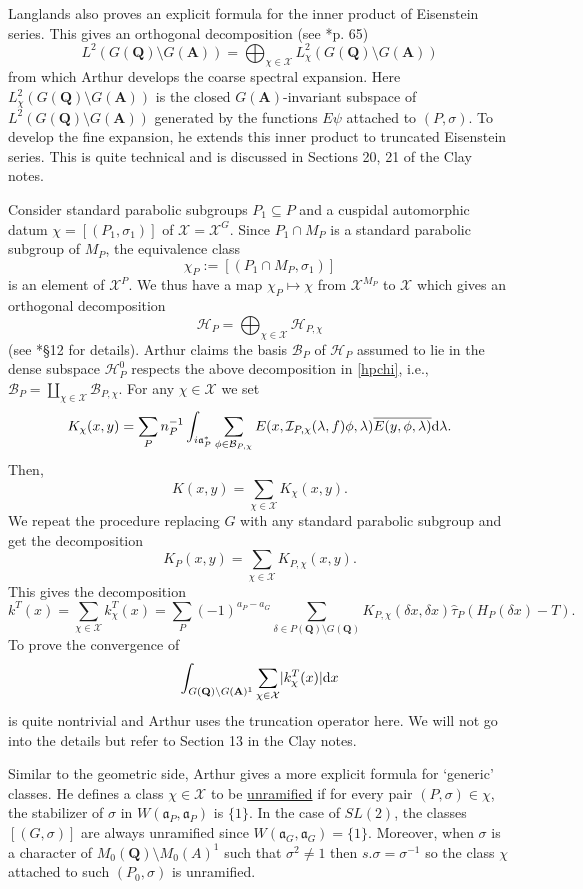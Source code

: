 \documentclass[11pt]{amsart}
\def\apg{a_{P} - a_{G}}
\def\A{\mathbf A}
\def\Q{\mathbf Q}
\def\BBB{\mathcal B}
\def\HHH{\mathcal H}
\def\III{\mathcal I}
\def\XXX{\mathcal X}
\def\aaa{\mathfrak a}
\def\d{\text d}
\def\bs{\setminus}
\def\Ltwo{L^2}
\def\mod#1{\lvert #1 \rvert} %
\theoremstyle{remark}
\begin{document}
Langlands also proves an explicit formula for the inner product of Eisenstein series. This gives an orthogonal decomposition (see \cite{clay}*{p. 65})
\begin{equation} \label{hpchi}
	\Ltwo(G(\Q)\bs G(\A)) = \bigoplus_{\chi \in \XXX} \Ltwo_\chi(G(\Q)\bs G(\A))
\end{equation}
from which Arthur develops the coarse spectral expansion. Here $\Ltwo_\chi(G(\Q)\bs G(\A))$ is the closed $G(\A)$-invariant subspace of $\Ltwo(G(\Q)\bs G(\A))$ generated by the functions $E\psi$ attached to $(P, \sigma)$. To develop the fine expansion, he extends this inner product to truncated Eisenstein series. This is quite technical and is discussed in Sections 20, 21 of the Clay notes. 

Consider standard parabolic subgroups $P_1 \subseteq P$ and a cuspidal automorphic datum $\chi = [(P_1, \sigma_1)]$ of $\XXX = \XXX^G$. Since $P_1 \cap M_P$ is a standard parabolic subgroup of $M_P$, the equivalence class 
\[ \chi_P := [(P_1 \cap M_P, \sigma_1)] \]
is an element of $\XXX^P$. We thus have a map $\chi_P \mapsto \chi$ from $\XXX^{M_P}$ to $\XXX$ which gives an orthogonal decomposition
\[ \HHH_P = \bigoplus_{\chi \in \XXX} \HHH_{P, \chi} \]
(see \cite{clay}*{\S 12} for details). 
Arthur claims the basis $\BBB_P$ of $\HHH_P$ assumed to lie in the dense subspace $\HHH_P^0$ respects the above decomposition in \cref{hpchi}, i.e., $\BBB_P = \coprod_{\chi \in \XXX} \BBB_{P, \chi}$. For any $\chi \in \XXX$ we set
\[ K_\chi(x, y) = \sum_P n_P^{-1} \int_{i\aaa_P^*} \sum_{\phi \in \BBB_{P, \chi}}
		E(x, \III_{P, \chi}(\lambda, f)\phi, \lambda) \overline{E(y, \phi, \lambda)} \d \lambda. \]
Then,
\[ K(x, y) = \sum_{\chi \in \XXX} K_\chi(x, y). \]
We repeat the procedure replacing $G$ with any standard parabolic subgroup and get the decomposition 
\[ K_P(x, y) = \sum_{\chi \in \XXX} K_{P, \chi}(x, y). \]
This gives the decomposition
\begin{equation*}
	k^T(x) = \sum_{\chi \in \XXX} k_\chi^T(x)  = \sum_P (-1)^{\apg} \sum_{\delta \in P(\Q)\bs G(\Q)} K_{P, \chi}(\delta x, \delta x) \hat\tau_P(H_P(\delta x) - T).
\end{equation*}
To prove the convergence of 
\[ \int_{G(\Q)\bs G(\A)^1} \sum_{\chi \in \XXX} \mod{k_\chi^T (x)} \d x \]
is quite nontrivial and Arthur uses the truncation operator here. We will not go into the details but refer to Section 13 in the Clay notes. 

Similar to the geometric side, Arthur gives a more explicit formula for `generic' classes. He defines a class $\chi \in \XXX$ to be \underline{unramified} if for every pair $(P, \sigma) \in \chi$, the stabilizer of $\sigma$ in $W(\aaa_P, \aaa_P)$ is $\{1\}$. In the case of $SL(2)$, the classes $[(G, \sigma)]$ are always unramified since $W(\aaa_G, \aaa_G) = \{1\}$. Moreover, when $\sigma$ is a character of $M_0(\Q)\bs M_0(A)^1$ such that $\sigma^2 \neq 1$ then $s.\sigma = \sigma^{-1}$ so the class $\chi$ attached to such $(P_0, \sigma)$ is unramified. 
\end{document}
